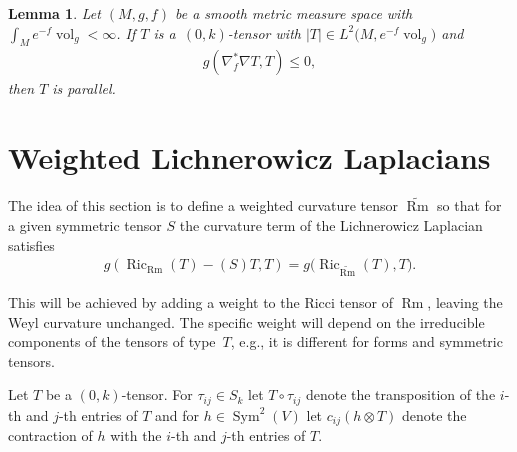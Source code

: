 \documentclass[10pt,a4paper]{amsart}
\numberwithin{equation}{section}
\newtheorem{Lemma}[Theorem]{Lemma}
\newcommand{\vol}{\operatorname{vol}}
\newcommand{\Ric} {\operatorname{Ric}}
\newcommand{\Rm} {\operatorname{Rm}}
\newcommand{ \Sym } {\operatorname{Sym}}
\begin{document}
\begin{Lemma}\label{BochnerTechniqueSMMS}
Let $(M,g,f)$ be a smooth metric measure space with $\int_M e^{-f} \vol_g < \infty$. If $T$ is a~$(0,k)$-tensor with $|T| \in L^{2}\big(M, e^{-f} \vol_g\big)$ and
\begin{gather*}
g ( \nabla_f^{*} \nabla T, T) \leq 0,
\end{gather*}
then $T$ is parallel.
\end{Lemma}


\section{Weighted Lichnerowicz Laplacians}

The idea of this section is to define a weighted curvature tensor $\widetilde{\Rm}$ so that for a given symmetric tensor $S$ the curvature term of the Lichnerowicz Laplacian satisfies
\begin{gather*}
g( \Ric_{\Rm}(T) - (S)T, T ) = g\big( \Ric_{\widetilde{\Rm}}(T),T\big).
\end{gather*}

This will be achieved by adding a weight to the Ricci tensor of $\Rm$, leaving the Weyl curvature unchanged. The specific weight will depend on the irreducible components of the tensors of type~$T$, e.g., it is different for forms and symmetric tensors.

Let $T$ be a $(0,k)$-tensor. For $\tau_{ij} \in S_k$ let $T \circ \tau_{ij}$ denote the transposition of the $i$-th and $j$-th entries of $T$ and for $h \in \Sym^2(V)$ let $c_{ij}(h \otimes T)$ denote the contraction of $h$ with the $i$-th and $j$-th entries of $T$.
\end{document}
